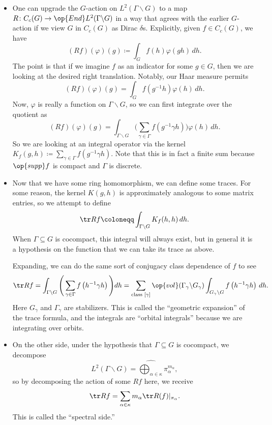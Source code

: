 \documentclass{article}
\begin{document}
\begin{itemize}
	\item One can upgrade the $G$-action on $L^2(\Gamma\backslash G)$ to a map $R\colon C_c(G)\to\op{End}L^2(\Gamma\backslash G)$ in a way that agrees with the earlier $G$-action if we view $G$ in $C_c(G)$ as Dirac $\delta$s. Explicitly, given $f\in C_c(G)$, we have
	\[(Rf)(\varphi)(g)\coloneqq\int_Gf(h)\varphi(gh)\,dh.\]
	The point is that if we imagine $f$ as an indicator for some $g\in G$, then we are looking at the desired right translation. Notably, our Haar measure permits
	\[(Rf)(\varphi)(g)=\int_Gf\left(g^{-1}h\right)\varphi(h)\,dh.\]
	Now, $\varphi$ is really a function on $\Gamma\backslash G$, so we can first integrate over the quotient as
	\[(Rf)(\varphi)(g)=\int_{\Gamma\backslash G}\Bigg(\sum_{\gamma\in\Gamma}f\left(g^{-1}\gamma h\right)\Bigg)\varphi(h)\,dh.\]
	So we are looking at an integral operator via the kernel $K_f(g,h)\coloneqq\sum_{\gamma\in\Gamma}f\left(g^{-1}\gamma h\right)$. Note that this is in fact a finite sum because $\op{supp}f$ is compact and $\Gamma$ is discrete.

	\item Now that we have some ring homomorphism, we can define some traces. For some reason, the kernel $K(g,h)$ is approximately analogous to some matrix entries, so we attempt to define
	\[\tr Rf\coloneqq\int_{\Gamma\backslash G}K_f(h,h)\,dh.\]
	When $\Gamma\subseteq G$ is cocompact, this integral will always exist, but in general it is a hypothesis on the function that we can take its trace as above.

	Expanding, we can do the same sort of conjugacy class dependence of $f$ to see
	\[\tr Rf=\int_{\Gamma\backslash G}\Bigg(\sum_{\gamma\in\Gamma}f\left(h^{-1}\gamma h\right)\Bigg)dh=\sum_{\text{class }[\gamma]}\op{vol}(\Gamma_\gamma\backslash G_\gamma)\int_{G_\gamma\backslash G}f\left(h^{-1}\gamma h\right)\,dh.\]
	Here $G_\gamma$ and $\Gamma_\gamma$ are stabilizers. This is called the ``geometric expansion'' of the trace formula, and the integrals are ``orbital integrals'' because we are integrating over orbits.

	\item On the other side, under the hypothesis that $\Gamma\subseteq G$ is cocompact, we decompose
	\[L^2(\Gamma\backslash G)=\widehat{\bigoplus_{\alpha\in\kappa}}\pi_\alpha^{m_\alpha},\]
	so by decomposing the action of some $Rf$ here, we receive
	\[\tr Rf=\sum_{\alpha\in\kappa}m_\alpha\tr R(f)|_{\pi_\alpha}.\]
	This is called the ``spectral side.''
\end{itemize}
\end{document}
